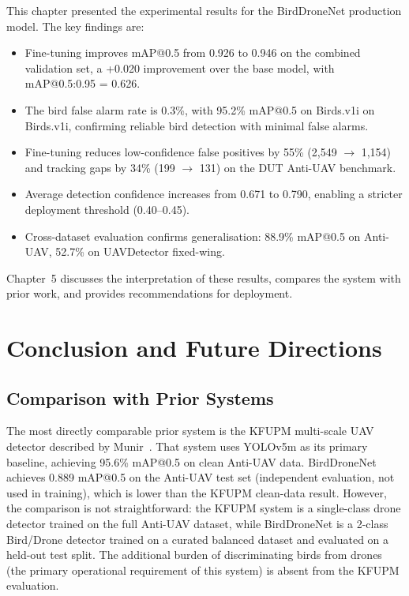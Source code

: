 \documentclass[12pt,a4paper]{report}
\begin{document}
This chapter presented the experimental results for the BirdDroneNet
production model. The key findings are:

\begin{itemize}
  \item Fine-tuning improves mAP@0.5 from 0.926 to 0.946 on the combined validation
        set, a +0.020 improvement over the base model, with mAP@0.5:0.95 = 0.626.
  \item The bird false alarm rate is 0.3\%, with 95.2\% mAP@0.5 on Birds.v1i
        on Birds.v1i, confirming reliable bird detection with minimal false alarms.
  \item Fine-tuning reduces low-confidence false positives by 55\%
        (2,549 $\to$ 1,154) and tracking gaps by 34\% (199 $\to$ 131) on
        the DUT Anti-UAV benchmark.
  \item Average detection confidence increases from 0.671 to 0.790,
        enabling a stricter deployment threshold (0.40--0.45).
  \item Cross-dataset evaluation confirms generalisation: 88.9\% mAP@0.5
        on Anti-UAV, 52.7\% on UAVDetector fixed-wing.
\end{itemize}

Chapter~5 discusses the interpretation of these results, compares the
system with prior work, and provides recommendations for deployment.

\chapter{Conclusion and Future Directions}

\section{Comparison with Prior Systems}

The most directly comparable prior system is the KFUPM multi-scale UAV
detector described by Munir~\cite{munir2023kfupm}. That system uses
YOLOv5m as its primary baseline, achieving 95.6\% mAP@0.5 on clean
Anti-UAV data. BirdDroneNet achieves 0.889 mAP@0.5 on the Anti-UAV
test set (independent evaluation, not used in training), which is lower
than the KFUPM clean-data result. However, the comparison is not
straightforward: the KFUPM system is a single-class drone detector
trained on the full Anti-UAV dataset, while BirdDroneNet is a
2-class Bird/Drone detector trained on a curated balanced dataset and
evaluated on a held-out test split. The additional burden of
discriminating birds from drones (the primary operational requirement
of this system) is absent from the KFUPM evaluation.
\end{document}
